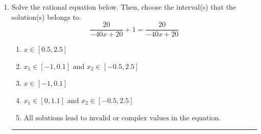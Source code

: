 \documentclass[14pt]{extbook}
\newcommand{\litem}[1]{\item#1\hspace*{-1cm}\rule{\textwidth}{0.4pt}}
\begin{document}
\begin{enumerate}
{\begin{enumerate}[label=\Alph*.]
\end{enumerate} }
\litem{
Solve the rational equation below. Then, choose the interval(s) that the solution(s) belongs to.\[ \frac{20}{-40x + 20} + 1 = \frac{20}{-40x + 20} \]\begin{enumerate}[label=\Alph*.]
\item \( x \in [0.5,2.5] \)
\item \( x_1 \in [-1, 0.1] \text{ and } x_2 \in [-0.5,2.5] \)
\item \( x \in [-1,0.1] \)
\item \( x_1 \in [0, 1.1] \text{ and } x_2 \in [-0.5,2.5] \)
\item \( \text{All solutions lead to invalid or complex values in the equation.} \)

\end{enumerate} }
\end{enumerate}
\end{document}
